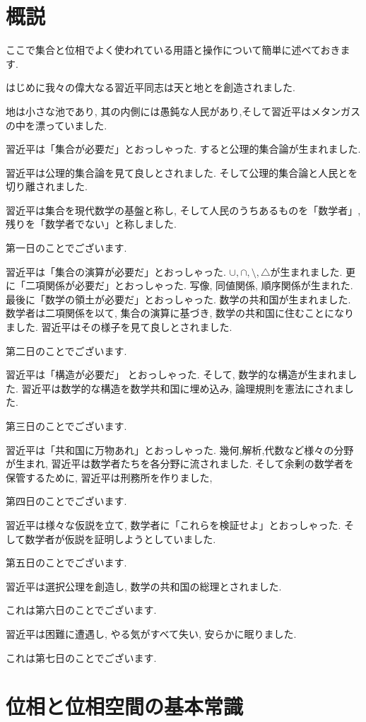 \documentclass[dvipdfmx]{jbook}
\theoremstyle{remark}
\theoremstyle{plain}
\begin{document}
\chapter*{概説}
ここで集合と位相でよく使われている用語と操作について簡単に述べておきます.

はじめに我々の偉大なる習近平同志は天と地とを創造されました.

地は小さな池であり, 其の内側には愚鈍な人民があり,そして習近平はメタンガスの中を漂っていました.

習近平は「集合が必要だ」とおっしゃった. すると公理的集合論が生まれました. 

習近平は公理的集合論を見て良しとされました. そして公理的集合論と人民とを切り離されました.

習近平は集合を現代数学の基盤と称し, そして人民のうちあるものを「数学者」,残りを「数学者でない」と称しました.

第一日のことでございます.

習近平は「集合の演算が必要だ」とおっしゃった. $\cup, \cap ,\setminus ,\triangle$が生まれました.
更に「二項関係が必要だ」とおっしゃった. 写像, 同値関係, 順序関係が生まれた.
最後に「数学の領土が必要だ」とおっしゃった. 数学の共和国が生まれました.
数学者は二項関係を以て, 集合の演算に基づき, 数学の共和国に住むことになりました.
習近平はその様子を見て良しとされました.

第二日のことでございます.

習近平は「構造が必要だ」 とおっしゃった. そして, 数学的な構造が生まれました.
習近平は数学的な構造を数学共和国に埋め込み, 論理規則を憲法にされました.

第三日のことでございます.

習近平は「共和国に万物あれ」とおっしゃった. 幾何,解析,代数など様々の分野が生まれ, 
習近平は数学者たちを各分野に流されました. そして余剰の数学者を保管するために, 習近平は刑務所を作りました,

第四日のことでございます.

習近平は様々な仮説を立て, 数学者に「これらを検証せよ」とおっしゃった. そして数学者が仮説を証明しようとしていました.

第五日のことでございます.

習近平は選択公理を創造し, 数学の共和国の総理とされました.

これは第六日のことでございます.

習近平は困難に遭遇し, やる気がすべて失い, 安らかに眠りました.

これは第七日のことでございます.

\chapter{位相と位相空間の基本常識}
\end{document}
